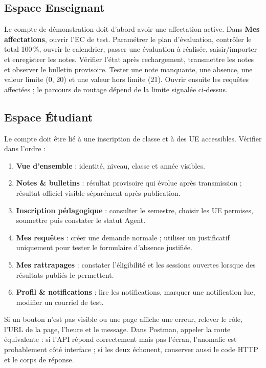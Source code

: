 \documentclass[10pt,a4paper]{article}
\begin{document}
\subsection{Espace Enseignant}

Le compte de démonstration doit d’abord avoir une affectation active. Dans \textbf{Mes affectations}, ouvrir l’EC de test. Paramétrer le plan d’évaluation, contrôler le total 100\,\%, ouvrir le calendrier, passer une évaluation à réalisée, saisir/importer et enregistrer les notes. Vérifier l’état après rechargement, transmettre les notes et observer le bulletin provisoire. Tester une note manquante, une absence, une valeur limite (0, 20) et une valeur hors limite (21). Ouvrir ensuite les requêtes affectées ; le parcours de routage dépend de la limite signalée ci-dessus.

\subsection{Espace Étudiant}

Le compte doit être lié à une inscription de classe et à des UE accessibles. Vérifier dans l’ordre :
\begin{enumerate}
\item \textbf{Vue d’ensemble} : identité, niveau, classe et année visibles.
\item \textbf{Notes \& bulletins} : résultat provisoire qui évolue après transmission ; résultat officiel visible séparément après publication.
\item \textbf{Inscription pédagogique} : consulter le semestre, choisir les UE permises, soumettre puis constater le statut Agent.
\item \textbf{Mes requêtes} : créer une demande normale ; utiliser un justificatif uniquement pour tester le formulaire d’absence justifiée.
\item \textbf{Mes rattrapages} : constater l’éligibilité et les sessions ouvertes lorsque des résultats publiés le permettent.
\item \textbf{Profil \& notifications} : lire les notifications, marquer une notification lue, modifier un courriel de test.
\end{enumerate}

Si un bouton n’est pas visible ou une page affiche une erreur, relever le rôle, l’URL de la page, l’heure et le message. Dans Postman, appeler la route équivalente : si l’API répond correctement mais pas l’écran, l’anomalie est probablement côté interface ; si les deux échouent, conserver aussi le code HTTP et le corps de réponse.
\end{document}
